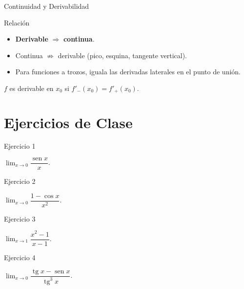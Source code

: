 \documentclass[aspectratio=169]{beamer}
\begin{document}
\begin{frame}{Continuidad y Derivabilidad}
  \begin{block}{Relación}
    \begin{itemize}
      \item \textbf{Derivable} $\Rightarrow$ \textbf{continua}.
      \item Continua $\not\Rightarrow$ derivable (pico, esquina, tangente vertical).
      \item Para funciones a trozos, iguala las derivadas laterales en el punto de unión.
    \end{itemize}
  \end{block}
  \vspace{6pt}
  \begin{mwextra}[Comprobación en $x_0$]
    $f$ es derivable en $x_0$ si $f'_-(x_0) = f'_+(x_0)$.
  \end{mwextra}
\end{frame}

\section{Ejercicios de Clase}

\begin{frame}{Ejercicio 1}
  \begin{mwejercicio}
    $\lim_{x\to0}\dfrac{\operatorname{sen} x}{x}$.
  \end{mwejercicio}
\end{frame}

\begin{frame}{Ejercicio 2}
  \begin{mwejercicio}
    $\lim_{x\to0}\dfrac{1 - \cos x}{x^2}$.
  \end{mwejercicio}
\end{frame}

\begin{frame}{Ejercicio 3}
  \begin{mwejercicio}
    $\lim_{x\to1}\dfrac{x^2 - 1}{x - 1}$.
  \end{mwejercicio}
\end{frame}

\begin{frame}{Ejercicio 4}
  \begin{mwejercicio}
    $\lim_{x\to0}\dfrac{\operatorname{tg}x - \operatorname{sen}x}{\operatorname{tg}^3 x}$.
  \end{mwejercicio}
\end{frame}
\end{document}
